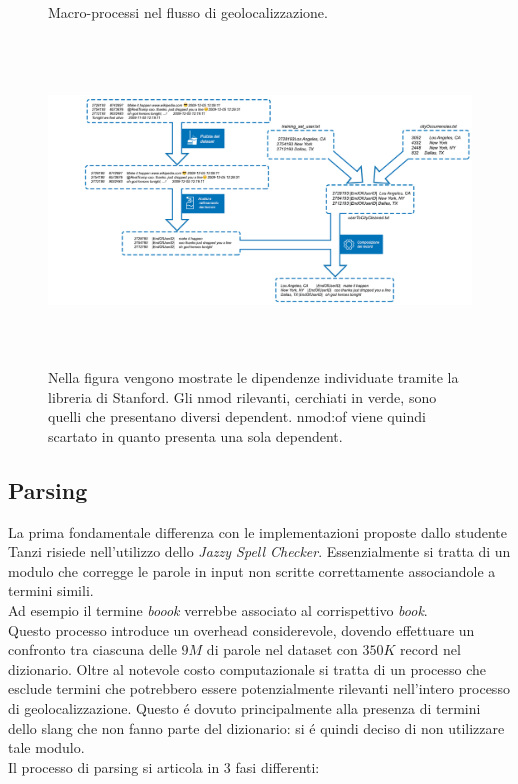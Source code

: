 \documentclass[twocolumn,10pt]{asme2ej}
\begin{document}
\begin{figure} 
\centerline{}
\caption{Macro-processi nel flusso di geolocalizzazione.}
\label{usatw.ps}
\end{figure}

\begin{figure}
  \includegraphics[width=16cm,height=8.65cm]{figure/matita2.png}
  \caption{Nella figura vengono mostrate le dipendenze individuate tramite la libreria di Stanford. Gli nmod rilevanti, cerchiati in verde, sono quelli che presentano diversi dependent. nmod:of viene quindi scartato in quanto presenta una sola dependent.}
\end{figure}  


\subsection{Parsing}

La prima fondamentale differenza con le implementazioni proposte dallo studente Tanzi risiede nell'utilizzo dello \textit{Jazzy Spell Checker}. Essenzialmente si tratta  di un modulo che corregge le parole in input non scritte correttamente associandole a termini simili. \\ Ad esempio il termine \textit{boook} verrebbe associato al corrispettivo \textit{book}. \\ Questo processo  introduce un overhead considerevole, dovendo effettuare un confronto tra ciascuna delle $9 M$ di parole nel dataset con $350K$ record nel dizionario. Oltre al notevole costo computazionale si tratta di un processo che esclude termini che potrebbero essere potenzialmente rilevanti nell'intero processo di geolocalizzazione. Questo \'e dovuto principalmente alla presenza di termini dello slang che non fanno parte del dizionario: si \'e quindi deciso di non utilizzare tale modulo.\\ Il processo di parsing si articola in 3 fasi differenti:
\end{document}
